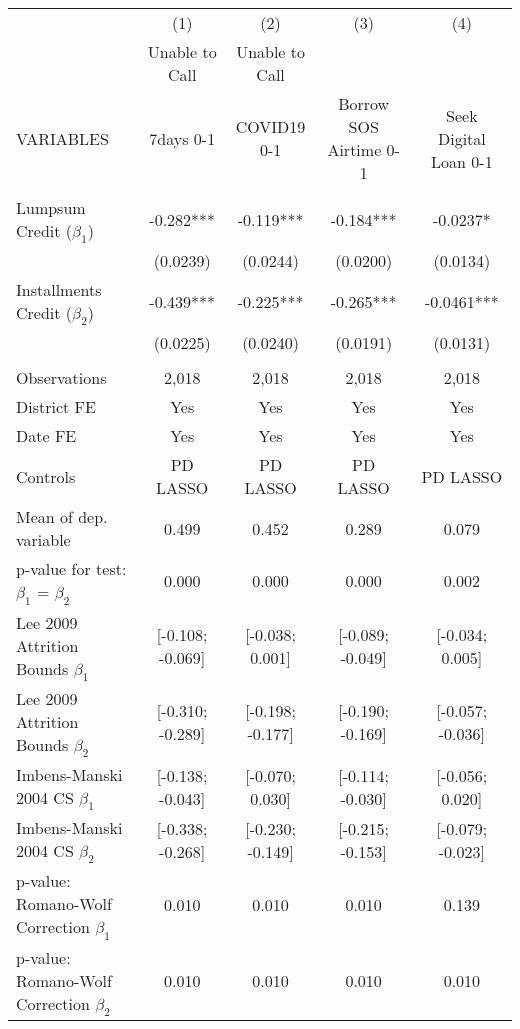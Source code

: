 \begin{tabular}{lcccc} \hline
 & (1) & (2) & (3) & (4) \\
 & Unable to Call & Unable to Call &  &  \\
VARIABLES & 7days 0-1 & COVID19 0-1 & Borrow SOS Airtime 0-1 & Seek Digital Loan 0-1 \\ \hline
 &  &  &  &  \\
Lumpsum Credit ($\beta_1$) & -0.282*** & -0.119*** & -0.184*** & -0.0237* \\
 & (0.0239) & (0.0244) & (0.0200) & (0.0134) \\
Installments Credit ($\beta_2$) & -0.439*** & -0.225*** & -0.265*** & -0.0461*** \\
 & (0.0225) & (0.0240) & (0.0191) & (0.0131) \\
 &  &  &  &  \\
Observations & 2,018 & 2,018 & 2,018 & 2,018 \\
District FE & Yes & Yes & Yes & Yes \\
Date FE & Yes & Yes & Yes & Yes \\
Controls & PD LASSO & PD LASSO & PD LASSO & PD LASSO \\
Mean of dep. variable & 0.499 & 0.452 & 0.289 & 0.079 \\
p-value for test: $\beta_1$ = $\beta_2$ & 0.000 & 0.000 & 0.000 & 0.002 \\
Lee 2009 Attrition Bounds $\beta_1$ & [-0.108; -0.069] & [-0.038; 0.001] & [-0.089; -0.049] & [-0.034; 0.005] \\
Lee 2009 Attrition Bounds $\beta_2$ & [-0.310; -0.289] & [-0.198; -0.177] & [-0.190; -0.169] & [-0.057; -0.036] \\
Imbens-Manski 2004 CS $\beta_1$ & [-0.138; -0.043] & [-0.070; 0.030] & [-0.114; -0.030] & [-0.056; 0.020] \\
Imbens-Manski 2004 CS $\beta_2$ & [-0.338; -0.268] & [-0.230; -0.149] & [-0.215; -0.153] & [-0.079; -0.023] \\
p-value: Romano-Wolf Correction $\beta_1$ & 0.010 & 0.010 & 0.010 & 0.139 \\
 p-value: Romano-Wolf Correction $\beta_2$ & 0.010 & 0.010 & 0.010 & 0.010 \\ \hline
\end{tabular}
